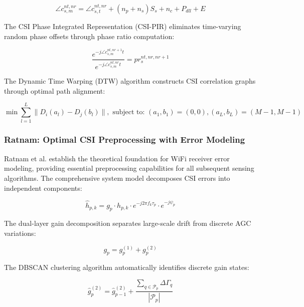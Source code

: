 \documentclass[journal]{IEEEtran}
\begin{document}
\begin{equation}
\angle c_{s,m}^{nt,nr} = \angle c_{s,t}^{nt,nr} + (n_p + n_s)S_s + n_c + P_{dll} + E
\label{eq:wiphase_phase_model}
\end{equation}

The CSI Phase Integrated Representation (CSI-PIR) eliminates time-varying random phase offsets through phase ratio computation:

\begin{equation}
\frac{e^{-j\angle c_{s,m}^{nt,nr+1} t}}{e^{-j\angle c_{s,m}^{nt,nr} t}} = pr_s^{nt,nr,nr+1}
\label{eq:wiphase_phase_ratio}
\end{equation}

The Dynamic Time Warping (DTW) algorithm constructs CSI correlation graphs through optimal path alignment:

\begin{equation}
\min \sum_{l=1}^{L} \|D_i(a_l) - D_j(b_l)\|, \text{ subject to: } (a_1,b_1) = (0,0), (a_L,b_L) = (M-1,M-1)
\label{eq:wiphase_dtw}
\end{equation}

\subsubsection{Ratnam: Optimal CSI Preprocessing with Error Modeling}

Ratnam et al. \cite{ratnam2024optimal} establish the theoretical foundation for WiFi receiver error modeling, providing essential preprocessing capabilities for all subsequent sensing algorithms. The comprehensive system model decomposes CSI errors into independent components:

\begin{equation}
\hat{h}_{p,k} = g_p \cdot h_{p,k} \cdot e^{-j2\pi f_k \tau_p} \cdot e^{-j\psi_p}
\label{eq:ratnam_error_model}
\end{equation}

The dual-layer gain decomposition separates large-scale drift from discrete AGC variations:

\begin{equation}
g_p = g_p^{(1)} + g_p^{(2)}
\label{eq:ratnam_gain_decomposition}
\end{equation}

The DBSCAN clustering algorithm automatically identifies discrete gain states:

\begin{equation}
\hat{g}_p^{(2)} = \hat{g}_{p-1}^{(2)} + \frac{\sum_{q \in \mathcal{P}_p} \Delta\Gamma_q}{|\mathcal{P}_p|}
\label{eq:ratnam_gain_estimation}
\end{equation}
\end{document}
